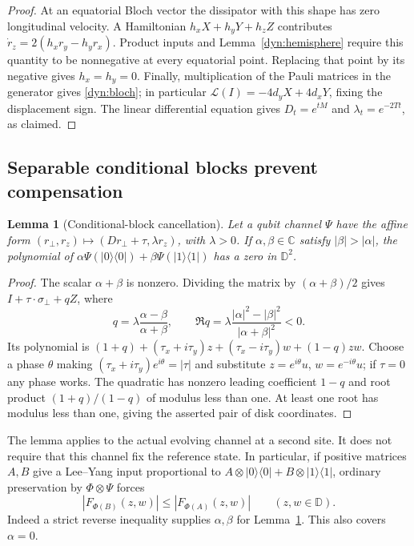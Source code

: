 \documentclass[reqno]{amsart}
\newtheorem{lemma}[theorem]{Lemma}
\theoremstyle{definition}
\theoremstyle{remark}
\newcommand{\C}{\mathbb C}
\newcommand{\D}{\mathbb D}
\begin{document}
\begin{proof}
At an equatorial Bloch vector the dissipator with this shape has zero
longitudinal velocity.  A Hamiltonian $h_xX+h_yY+h_zZ$ contributes
$\dot r_z=2(h_xr_y-h_yr_x)$.  Product inputs and
Lemma~\ref{dyn:hemisphere} require this quantity to be nonnegative at
every equatorial point.  Replacing that point by its negative gives
$h_x=h_y=0$.  Finally, multiplication of the Pauli matrices in the
generator gives \eqref{dyn:bloch}; in particular
$\mathcal L(I)=-4d_yX+4d_xY$, fixing the displacement sign.
The linear differential equation gives $D_t=e^{tM}$ and
$\lambda_t=e^{-2Tt}$, as claimed.
\end{proof}

\subsection{Separable conditional blocks prevent compensation}

\begin{lemma}[Conditional-block cancellation]\label{dyn:cancellation}
Let a qubit channel $\Psi$ have the affine form
$(r_\perp,r_z)\mapsto(D r_\perp+\tau,\lambda r_z)$, with $\lambda>0$.
If $\alpha,\beta\in\C$ satisfy $|\beta|>|\alpha|$, the polynomial of
$\alpha\Psi(|0\rangle\langle0|)+\beta\Psi(|1\rangle\langle1|)$ has a zero
in $\D^2$.
\end{lemma}

\begin{proof}
The scalar $\alpha+\beta$ is nonzero.  Dividing the matrix by
$(\alpha+\beta)/2$ gives $I+\tau\cdot\sigma_\perp+qZ$, where
\[
 q=\lambda\frac{\alpha-\beta}{\alpha+\beta},\qquad
 \Re q=\lambda\frac{|\alpha|^2-|\beta|^2}{|\alpha+\beta|^2}<0.
\]
Its polynomial is
$(1+q)+(\tau_x+i\tau_y)z+(\tau_x-i\tau_y)w+(1-q)zw$.
Choose a phase $\theta$ making
$(\tau_x+i\tau_y)e^{i\theta}=|\tau|$ and substitute
$z=e^{i\theta}u$, $w=e^{-i\theta}u$; if $\tau=0$ any phase works.
The quadratic has nonzero leading coefficient $1-q$ and root product
$(1+q)/(1-q)$ of modulus less than one.  At least one root has modulus
less than one, giving the asserted pair of disk coordinates.
\end{proof}

The lemma applies to the actual evolving channel at a second site.
It does not require that this channel fix the reference state.  In
particular, if positive matrices $A,B$ give a Lee--Yang input proportional
to $A\otimes|0\rangle\langle0|+B\otimes|1\rangle\langle1|$, ordinary
preservation by $\Phi\otimes\Psi$ forces
\begin{equation}\label{dyn:dominance-necessary}
 |F_{\Phi(B)}(z,w)|\le |F_{\Phi(A)}(z,w)|\qquad (z,w\in\D).
\end{equation}
Indeed a strict reverse inequality supplies $\alpha,\beta$ for
Lemma~\ref{dyn:cancellation}.  This also covers $\alpha=0$.
\end{document}
